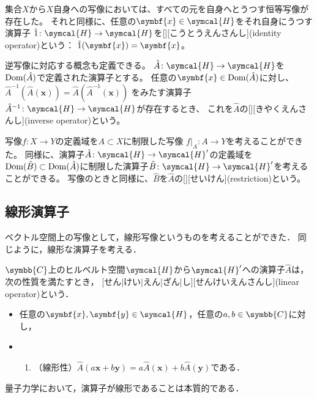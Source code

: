\documentclass[../sotsu.tex]{subfiles}
\begin{document}
集合$X$から$X$自身への写像においては、すべての元を自身へとうつす恒等写像が存在した。
それと同様に、任意の$\symbf{x} \in \symcal{H}$をそれ自身にうつす演算子
$\idop \colon \symcal{H} \to \symcal{H}$を[][こうとうえんさんし](identity operator)という：
$\idop(\symbf{x}) = \symbf{x}$。

逆写像に対応する概念も定義できる。
$\hat{A} \colon \symcal{H} \to \symcal{H}$を$\operatorname{Dom}(\hat{A})$で定義された演算子とする。
任意の$\symbf{x} \in \domain(\hat{A})$に対し、
$\hat{A}^{-1} ( \hat{A} (\symbf{x}) ) = \hat{A} ( \hat{A}^{-1} (\symbf{x}) ) $
をみたす演算子$\hat{A}^{-1} \colon \symcal{H} \to \symcal{H}$が存在するとき、
これを$\hat{A}$の[][きやくえんさんし](inverse operator)という。

写像$f \colon X \to Y$の定義域を$A \subset X$に制限した写像
$f \vert_A \colon A \to Y$を考えることができた。
同様に、演算子$\hat{A} \colon \symcal{H} \to \symcal{H}'$の定義域を
$\operatorname{Dom}(\hat{B}) \subset \operatorname{Dom}(\hat{A})$に制限した演算子$\hat{B} \colon \symcal{H} \to \symcal{H}'$を考えることができる。
写像のときと同様に、$\hat{B}$を$\hat{A}$の[][せいけん](restriction)という。


\subsection{線形演算子}

ベクトル空間上の写像として，線形写像というものを考えることができた．
同じように，線形な演算子を考える．
\begin{definition}[線形演算子]
    $\symbb{C}$上のヒルベルト空間$\symcal{H}$から$\symcal{H}'$への演算子$\hat{A}$は，次の性質を満たすとき，
    [せん|けい|えん|ざん|し][せんけいえんさんし](linear operator)という．
    \begin{itemize}
        \item 任意の$\symbf{x}, \symbf{y} \in \symcal{H}$，任意の$a, b \in \symbb{C}$に対し，
        \item \begin{enumerate}
            \item （線形性）$\hat{A}( a \symbf{x} + b \symbf{y} ) = a \hat{A} (\symbf{x}) + b \hat{A} (\symbf{y})$である．
        \end{enumerate}
    \end{itemize}
\end{definition}

量子力学において，演算子が線形であることは本質的である．
\end{document}
